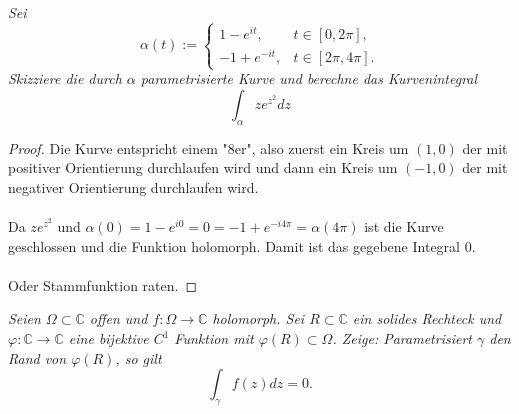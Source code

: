 \documentclass[11pt]{article}
\newenvironment{problem}[2][Beispiel]{
    \begin{trivlist}
        \item[\hskip \labelsep {\bfseries #1}\hskip \labelsep {\bfseries #2.}] \itshape}{
    \end{trivlist}\normalshape
}
\begin{document}
    \begin{problem}{2}
        Sei
        $$
        \alpha(t):= \begin{cases}1-e^{i t}, & t \in[0,2 \pi], \\ -1+e^{-i t}, & t \in[2 \pi, 4 \pi] .
        \end{cases}
        $$
        Skizziere die durch $\alpha$ parametrisierte Kurve und berechne das Kurvenintegral
        $$
        \int_\alpha z e^{z^2} d z
        $$
    \end{problem}

    \begin{proof}
        Die Kurve entspricht einem "8er", also zuerst ein Kreis um $(1,0)$ der mit positiver Orientierung durchlaufen
        wird und dann ein Kreis um $(-1,0)$ der mit negativer Orientierung durchlaufen wird. \\\\
        Da $ze^{z^2}$ und $\alpha(0) = 1-e ^{i0} = 0 = -1+e^{-i 4\pi} = \alpha(4\pi)$ ist die Kurve geschlossen
        und die Funktion holomorph. Damit ist das gegebene Integral $0$.\\\\
        Oder Stammfunktion raten.
    \end{proof}

    \begin{problem}{3}
        Seien $\Omega \subset \mathbb{C}$ offen und $f: \Omega \rightarrow \mathbb{C}$ holomorph. Sei $R \subset \mathbb{C}$ ein solides Rechteck
        und $\varphi: \mathbb{C} \rightarrow \mathbb{C}$ eine bijektive $C^1$ Funktion mit $\varphi(R) \subset \Omega$. Zeige: Parametrisiert $\gamma$ den Rand
        von $\varphi(R)$, so gilt
        $$
        \int_\gamma f(z) d z=0 .
        $$
    \end{problem}
\end{document}
